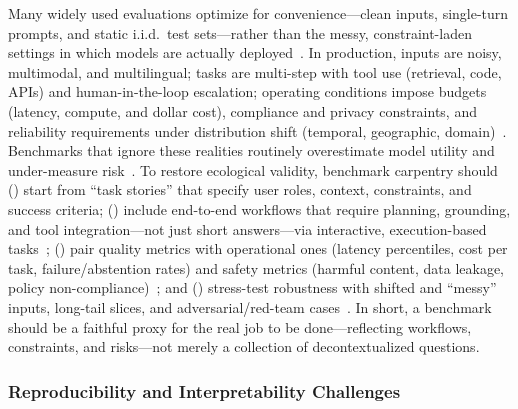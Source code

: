 Many widely used evaluations optimize for convenience—clean inputs, single-turn prompts, and static i.i.d.\ test sets—rather than the messy, constraint-laden settings in which models are actually deployed~\cite{liang2023holistic, kiela2021dynabench}.
In production, inputs are noisy, multimodal, and multilingual; tasks are multi-step with tool use (retrieval, code, APIs) and human-in-the-loop escalation; operating conditions impose budgets (latency, compute, and dollar cost), compliance and privacy constraints, and reliability requirements under distribution shift (temporal, geographic, domain)~\cite{koh2021wilds, liang2023holistic}.
Benchmarks that ignore these realities routinely overestimate model utility and under-measure risk~\cite{ribeiro2020beyond, kiela2021dynabench}.
To restore ecological validity, benchmark carpentry should () start from ``task stories'' that specify user roles, context, constraints, and success criteria; () include end-to-end workflows that require planning, grounding, and tool integration—not just short answers—via interactive, execution-based tasks~\cite{majumdar2025redteamingaired, liu2024agentbench, miehling2025agenticaineedssystems, li2023api, xiong2025butterfly, xie2024osworld}; () pair quality metrics with operational ones (latency percentiles, cost per task, failure/abstention rates) and safety metrics (harmful content, data leakage, policy non-compliance)~\cite{gehman2020realtoxicityprompts}; and () stress-test robustness with shifted and ``messy'' inputs, long-tail slices, and adversarial/red-team cases~\cite{koh2021wilds, nie2020adversarial, zheng2025all}.
In short, a benchmark should be a faithful proxy for the real job to be done—reflecting workflows, constraints, and risks—not merely a collection of decontextualized questions.

\subsubsection{Reproducibility and Interpretability Challenges}
\label{subsec:benchmarks-limits-reprod}